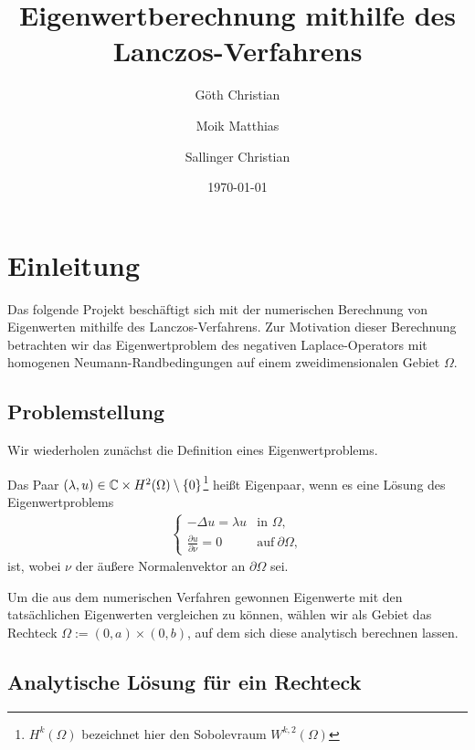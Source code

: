\documentclass{article}
\begin{document}
\title
{
	Eigenwertberechnung mithilfe des Lanczos-Verfahrens
}
\author
{
	Göth Christian
	\and
	Moik Matthias
	\and
	Sallinger Christian
}
\date{\today}
\maketitle

\newpage
\tableofcontents
\newpage

\pagestyle{headings}

\section{Einleitung}

Das folgende Projekt beschäftigt sich mit der numerischen Berechnung von Eigenwerten mithilfe des Lanczos-Verfahrens. Zur Motivation dieser Berechnung betrachten wir das Eigenwertproblem des negativen Laplace-Operators mit homogenen Neumann-Randbedingungen auf einem zweidimensionalen Gebiet $\Omega$.

\subsection{Problemstellung}

Wir wiederholen zunächst die Definition eines Eigenwertproblems.

\begin{definition}
	Das Paar $(\lambda, u) \in \mathbb{C} \times H^2(\Omega) \setminus \{0\}$\footnote{$H^k(\Omega)$ bezeichnet hier den Sobolevraum $W^{k,2}(\Omega)$} heißt Eigenpaar, wenn es eine Lösung des Eigenwertproblems
	\begin{align}
	    \begin{cases}
	    -\Delta u = \lambda u & \text{in } \Omega, \\
	    \frac{\partial u}{\partial \nu} = 0 & \text{auf}~ \partial\Omega,
	    \end{cases}
	    \label{neumann}
	\end{align}
	ist, wobei $\nu$ der äußere Normalenvektor an $\partial\Omega$ sei.
\end{definition}

Um die aus dem numerischen Verfahren gewonnen Eigenwerte mit den tatsächlichen Eigenwerten vergleichen zu können, wählen wir als Gebiet das Rechteck $\Omega := (0,a) \times (0,b)$, auf dem sich diese analytisch berechnen lassen.

\subsection{Analytische Lösung für ein Rechteck}
\end{document}
